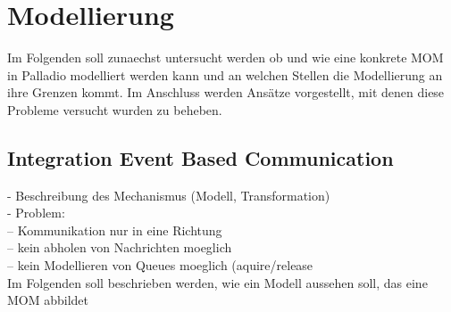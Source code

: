 
\chapter{Modellierung}
\label{ch:modellierung}
Im Folgenden soll zunaechst untersucht werden ob und wie eine konkrete MOM in Palladio modelliert werden kann und an welchen Stellen die Modellierung an ihre Grenzen kommt. Im Anschluss werden Ansätze vorgestellt, mit denen diese Probleme versucht wurden zu beheben.








\section{Integration Event Based Communication}
- Beschreibung des Mechanismus (Modell, Transformation) \\
- Problem:  \\
-- Kommunikation nur in eine Richtung \\
-- kein abholen von Nachrichten moeglich \\
-- kein Modellieren von Queues moeglich (aquire/release \\
Im Folgenden soll beschrieben werden, wie ein Modell aussehen soll, das eine MOM abbildet \\
